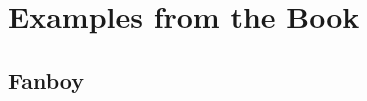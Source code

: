 \documentclass[presentation]{beamer}\mode<presentation>{\usetheme{AMSBolognaFC}}
\begin{document}
\section{Examples from the \jason{} Book}

\subsection{Fanboy}

\end{document}
